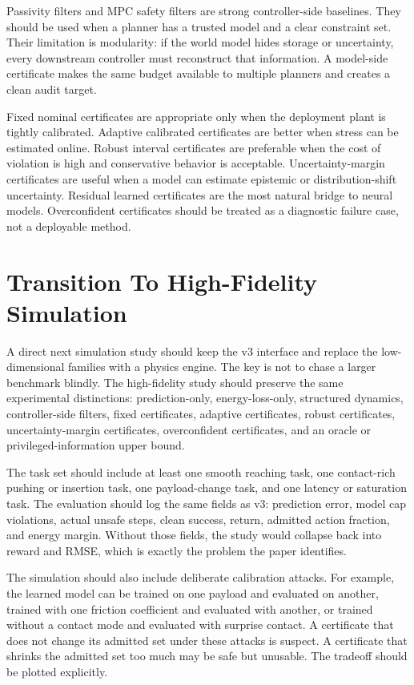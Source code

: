 \documentclass{article}
\begin{document}
Passivity filters and MPC safety filters are strong controller-side baselines. They should be used when a planner has a trusted model and a clear constraint set. Their limitation is modularity: if the world model hides storage or uncertainty, every downstream controller must reconstruct that information. A model-side certificate makes the same budget available to multiple planners and creates a clean audit target.

Fixed nominal certificates are appropriate only when the deployment plant is tightly calibrated. Adaptive calibrated certificates are better when stress can be estimated online. Robust interval certificates are preferable when the cost of violation is high and conservative behavior is acceptable. Uncertainty-margin certificates are useful when a model can estimate epistemic or distribution-shift uncertainty. Residual learned certificates are the most natural bridge to neural models. Overconfident certificates should be treated as a diagnostic failure case, not a deployable method.

\clearpage
\section{Transition To High-Fidelity Simulation}

A direct next simulation study should keep the v3 interface and replace the low-dimensional families with a physics engine. The key is not to chase a larger benchmark blindly. The high-fidelity study should preserve the same experimental distinctions: prediction-only, energy-loss-only, structured dynamics, controller-side filters, fixed certificates, adaptive certificates, robust certificates, uncertainty-margin certificates, overconfident certificates, and an oracle or privileged-information upper bound.

The task set should include at least one smooth reaching task, one contact-rich pushing or insertion task, one payload-change task, and one latency or saturation task. The evaluation should log the same fields as v3: prediction error, model cap violations, actual unsafe steps, clean success, return, admitted action fraction, and energy margin. Without those fields, the study would collapse back into reward and RMSE, which is exactly the problem the paper identifies.

The simulation should also include deliberate calibration attacks. For example, the learned model can be trained on one payload and evaluated on another, trained with one friction coefficient and evaluated with another, or trained without a contact mode and evaluated with surprise contact. A certificate that does not change its admitted set under these attacks is suspect. A certificate that shrinks the admitted set too much may be safe but unusable. The tradeoff should be plotted explicitly.
\end{document}
